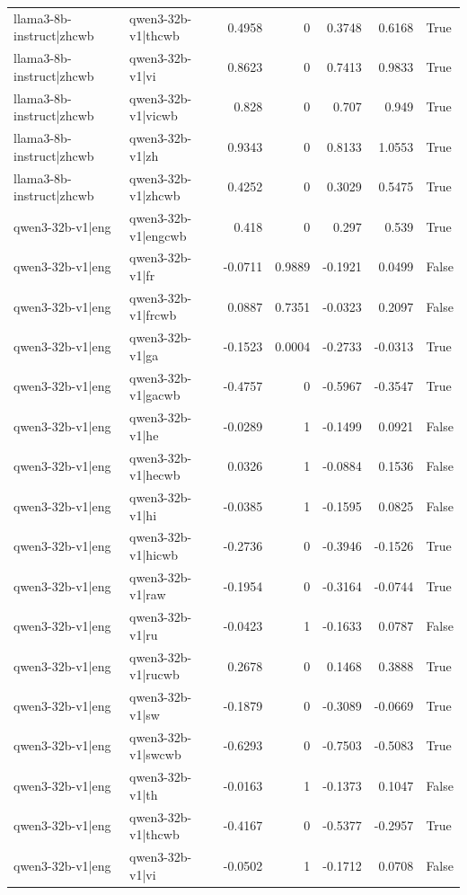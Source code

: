 \begin{table}
\begin{tabular}{l l r r r r l}
llama3-8b-instruct|zhcwb & qwen3-32b-v1|thcwb & 0.4958 & 0 & 0.3748 & 0.6168 & True \\
llama3-8b-instruct|zhcwb & qwen3-32b-v1|vi & 0.8623 & 0 & 0.7413 & 0.9833 & True \\
llama3-8b-instruct|zhcwb & qwen3-32b-v1|vicwb & 0.828 & 0 & 0.707 & 0.949 & True \\
llama3-8b-instruct|zhcwb & qwen3-32b-v1|zh & 0.9343 & 0 & 0.8133 & 1.0553 & True \\
llama3-8b-instruct|zhcwb & qwen3-32b-v1|zhcwb & 0.4252 & 0 & 0.3029 & 0.5475 & True \\
qwen3-32b-v1|eng & qwen3-32b-v1|engcwb & 0.418 & 0 & 0.297 & 0.539 & True \\
qwen3-32b-v1|eng & qwen3-32b-v1|fr & -0.0711 & 0.9889 & -0.1921 & 0.0499 & False \\
qwen3-32b-v1|eng & qwen3-32b-v1|frcwb & 0.0887 & 0.7351 & -0.0323 & 0.2097 & False \\
qwen3-32b-v1|eng & qwen3-32b-v1|ga & -0.1523 & 0.0004 & -0.2733 & -0.0313 & True \\
qwen3-32b-v1|eng & qwen3-32b-v1|gacwb & -0.4757 & 0 & -0.5967 & -0.3547 & True \\
qwen3-32b-v1|eng & qwen3-32b-v1|he & -0.0289 & 1 & -0.1499 & 0.0921 & False \\
qwen3-32b-v1|eng & qwen3-32b-v1|hecwb & 0.0326 & 1 & -0.0884 & 0.1536 & False \\
qwen3-32b-v1|eng & qwen3-32b-v1|hi & -0.0385 & 1 & -0.1595 & 0.0825 & False \\
qwen3-32b-v1|eng & qwen3-32b-v1|hicwb & -0.2736 & 0 & -0.3946 & -0.1526 & True \\
qwen3-32b-v1|eng & qwen3-32b-v1|raw & -0.1954 & 0 & -0.3164 & -0.0744 & True \\
qwen3-32b-v1|eng & qwen3-32b-v1|ru & -0.0423 & 1 & -0.1633 & 0.0787 & False \\
qwen3-32b-v1|eng & qwen3-32b-v1|rucwb & 0.2678 & 0 & 0.1468 & 0.3888 & True \\
qwen3-32b-v1|eng & qwen3-32b-v1|sw & -0.1879 & 0 & -0.3089 & -0.0669 & True \\
qwen3-32b-v1|eng & qwen3-32b-v1|swcwb & -0.6293 & 0 & -0.7503 & -0.5083 & True \\
qwen3-32b-v1|eng & qwen3-32b-v1|th & -0.0163 & 1 & -0.1373 & 0.1047 & False \\
qwen3-32b-v1|eng & qwen3-32b-v1|thcwb & -0.4167 & 0 & -0.5377 & -0.2957 & True \\
qwen3-32b-v1|eng & qwen3-32b-v1|vi & -0.0502 & 1 & -0.1712 & 0.0708 & False \\

\end{tabular}
\end{table}
